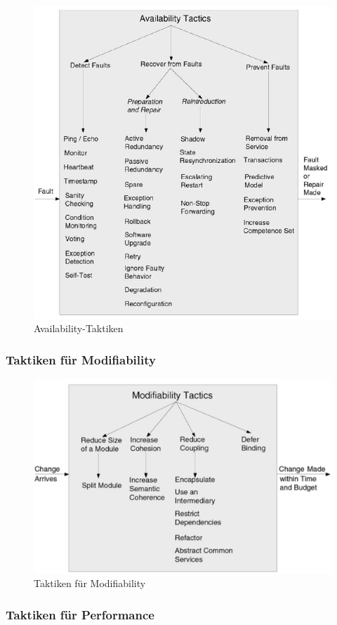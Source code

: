 \begin{figure}[h!]
	\centering
	\includegraphics[width=0.7\linewidth]{fig/tactic-availability}
	\caption{Availability-Taktiken}
	\label{fig:tactic-availability}
\end{figure}

\newpage

\subsubsection{Taktiken für Modifiability}

\begin{figure}[h!]
	\centering
	\includegraphics[width=0.7\linewidth]{fig/tactic-modifability}
	\caption{Taktiken für Modifiability}
	\label{fig:tactic-modifability}
\end{figure}

\subsubsection{Taktiken für Performance}

